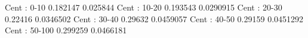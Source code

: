 Cent : 0-10
0.182147 0.025844
Cent : 10-20
0.193543 0.0290915
Cent : 20-30
0.22416 0.0346502
Cent : 30-40
0.29632 0.0459057
Cent : 40-50
0.29159 0.0451292
Cent : 50-100
0.299259 0.0466181
